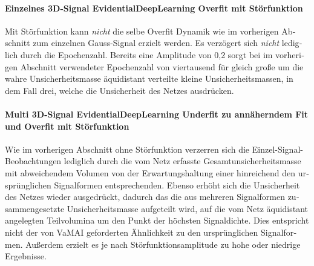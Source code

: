 \begin{otherlanguage}{ngerman}
\paragraph{Einzelnes 3D-Signal \gls{EvidentialDeepLearning} Overfit mit Störfunktion}

Mit Störfunktion kann \textit{nicht} die selbe Overfit Dynamik wie im vorherigen Abschnitt zum einzelnen Gauss-Signal erzielt werden. Es verzögert sich \textit{nicht} lediglich durch die Epochenzahl. Bereits eine Amplitude von 0,2 sorgt bei im vorherigen Abschnitt verwendeter Epochenzahl von viertausend für gleich große um die wahre Unsicherheitsmasse äquidistant verteilte kleine Unsicherheitsmassen, in dem Fall drei, welche die Unsicherheit des Netzes ausdrücken. 



\paragraph{Multi 3D-Signal \gls{EvidentialDeepLearning} Underfit zu annäherndem Fit und Overfit mit Störfunktion} 

Wie im vorherigen Abschnitt ohne Störfunktion verzerren sich die Einzel-Signal-Beobachtungen lediglich durch die vom Netz erfasste Gesamtunsicherheitsmasse mit abweichendem Volumen von der Erwartungshaltung einer hinreichend den ursprünglichen Signalformen entsprechenden. Ebenso erhöht sich die Unsicherheit des Netzes wieder ausgedrückt, dadurch das die aus mehreren Signalformen zusammengesetzte Unsicherheitsmasse aufgeteilt wird, auf die vom Netz äquidistant angelegten Teilvolumina um den Punkt der höchsten Signaldichte. Dies entspricht nicht der von VaMAI geforderten Ähnlichkeit zu den ursprünglichen Signalformen. Außerdem erzielt es je nach Störfunktionsamplitude zu hohe oder niedrige Ergebnisse. 




\end{otherlanguage}
